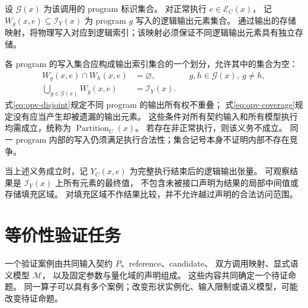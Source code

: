 设 $\mathcal{G}(x)$ 为该调用的 program 标识集合。
对正常执行 $e\in\mathcal{E}_C(x)$，
记 $W_g(x,e)\subseteq\mathcal{I}_Y(x)$ 为 program $g$ 写入的逻辑输出元素集合。
通过输出的存储映射，将物理写入对应到逻辑索引；该映射必须保证不同逻辑输出元素具有独立存储。

各 program 的写入集合应构成输出索引集合的一个划分，允许其中的集合为空：
\begin{align}
  W_g(x,e)\cap W_h(x,e)&=\varnothing,
  &&g,h\in\mathcal{G}(x),\ g\ne h,
  \label{eq:opv-disjoint}\\
  \bigcup_{g\in\mathcal{G}(x)}W_g(x,e)&=\mathcal{I}_Y(x).
  \label{eq:opv-coverage}
\end{align}
式\eqref{eq:opv-disjoint}规定不同 program 的输出所有权不重叠；
式\eqref{eq:opv-coverage}规定没有应当产生却被遗漏的输出元素。
这些条件对所有契约输入和所有模型执行均需成立，统称为 $\operatorname{Partition}_C(x)$。
若存在非正常执行，则该义务不成立。
同一 program 内部的写入仍须满足执行合法性；集合记号本身不证明内部不存在竞争。

当上述义务成立时，记 $Y_C(x,e)$ 为完整执行结束后的逻辑输出张量。
可观察结果是 $\mathcal{I}_Y(x)$ 上所有元素的最终值，
不包含未被接口声明为结果的局部中间值或存储填充区域。
对填充区域不作结果比较，并不允许越过声明的合法访问范围。

\section{等价性验证任务}
\label{sec:opv-problem}

\begin{definition}[验证案例]
  一个验证案例由共同输入契约 $P$、reference、candidate、
  双方调用映射、显式语义模型 $\mathcal{M}$，
  以及固定参数与量化域的声明组成。
  这些内容共同确定一个待证命题。
  同一算子可以具有多个案例；改变形状实例化、输入限制或语义模型，可能改变待证命题。
\end{definition}

